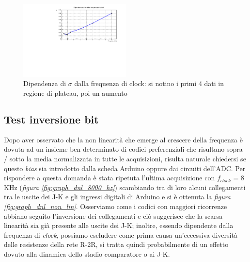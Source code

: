 \documentclass[journal]{IEEEtran}
\begin{document}
\begin{figure}[H]%
\begin{center}
\includegraphics[width=0.50\textwidth]{analysis/output/dnl_sigma_pdf}
\caption{Dipendenza di $\sigma$ dalla frequenza di clock: si notino i primi 4 dati in regione di plateau, poi un aumento}
\label{fig:graph_dnl_sigma}
\end{center}
\end{figure}

\subsection{Test inversione bit}
Dopo aver osservato che la non linearità che emerge al crescere della frequenza è dovuta ad un insieme ben determinato di codici preferenziali che risultano sopra / sotto la media normalizzata in tutte le acquisizioni, risulta naturale chiedersi se questo \textit{bias} sia introdotto dalla scheda Arduino oppure dai circuiti dell'ADC. Per rispondere a questa domanda è stata ripetuta l'ultima acquisizione con $f_{clock}$ = 8 KHz (\textit{figura \ref{fig:graph_dnl_8000_hz}}) scambiando tra di loro alcuni collegamenti tra le uscite dei J-K e gli ingressi digitali di Arduino e si è ottenuta la \textit{figura}  \textit{\ref{fig:graph_dnl_non_lin}}.
Osserviamo come i codici con maggiori ricorrenze abbiano seguito l'inversione dei collegamenti e ciò suggerisce che la scarsa linearità sia già presente alle uscite dei J-K; inoltre, essendo dipendente dalla frequenza di \textit{clock}, possiamo escludere come prima causa un'eccessiva diversità delle resistenze della rete R-2R, si tratta quindi probabilmente di un effetto dovuto alla dinamica dello stadio comparatore o ai J-K. 
\end{document}
